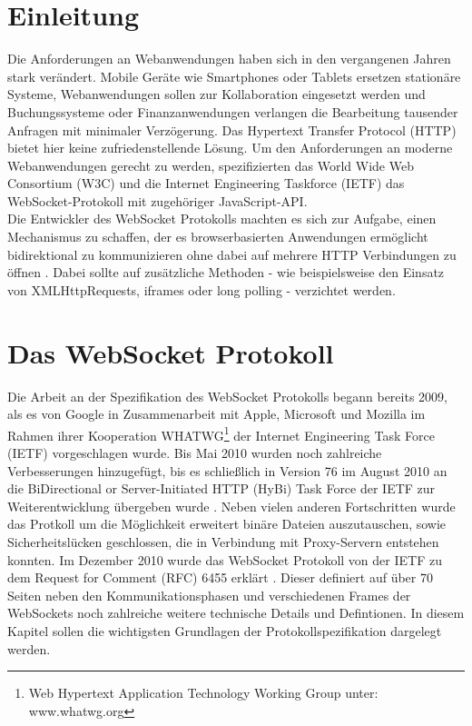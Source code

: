 \documentclass[11pt,a4paper,titlepage]{scrartcl}
\numberwithin{equation}{section}
\begin{document}
\section{Einleitung}\label{sec:Einleitung}
Die Anforderungen an Webanwendungen haben sich in den vergangenen Jahren stark verändert. Mobile Geräte wie Smartphones oder Tablets ersetzen stationäre Systeme, Webanwendungen sollen zur Kollaboration eingesetzt werden und Buchungssysteme oder Finanzanwendungen verlangen die Bearbeitung tausender Anfragen mit minimaler Verzögerung. Das Hypertext Transfer Protocol (HTTP) bietet hier keine zufriedenstellende Lösung. Um den Anforderungen an moderne Webanwendungen gerecht zu werden, spezifizierten das World Wide Web Consortium (W3C) und die Internet Engineering Taskforce (IETF) das WebSocket-Protokoll mit zugehöriger JavaScript-API. \\

\noindent Die Entwickler des WebSocket Protokolls machten es sich zur Aufgabe, einen Mechanismus zu schaffen, der es browserbasierten Anwendungen ermöglicht bidirektional zu kommunizieren ohne dabei auf mehrere HTTP Verbindungen zu öffnen \autocite{fette_websocket_2011}. Dabei sollte auf zusätzliche Methoden - wie beispielsweise den Einsatz von XMLHttpRequests, iframes oder long polling - verzichtet werden.

\newpage
\section{Das WebSocket Protokoll}\label{sec:WebSocketProtokoll}
Die Arbeit an der Spezifikation des WebSocket Protokolls begann bereits 2009, als es von Google in Zusammenarbeit mit Apple, Microsoft und Mozilla im Rahmen ihrer Kooperation WHATWG\footnote{Web Hypertext Application Technology Working Group unter: www.whatwg.org} der Internet Engineering Task Force (IETF) vorgeschlagen wurde. Bis Mai 2010 wurden noch zahlreiche Verbesserungen hinzugefügt, bis es schließlich in Version 76 \autocite{hickson_websocket_2010} im August 2010 an die BiDirectional or Server-Initiated HTTP (HyBi) Task Force der IETF zur Weiterentwicklung übergeben wurde \autocite{fette_websocket_2010}. Neben vielen anderen Fortschritten wurde das Protkoll um die Möglichkeit erweitert binäre Dateien auszutauschen, sowie Sicherheitslücken geschlossen, die in Verbindung mit Proxy-Servern entstehen konnten. Im Dezember 2010 wurde das WebSocket Protokoll von der IETF zu dem Request for Comment (RFC) 6455 erklärt \autocite{fette_websocket_2011}. Dieser definiert auf über 70 Seiten neben den Kommunikationsphasen und verschiedenen Frames der WebSockets noch zahlreiche weitere technische Details und Defintionen. In diesem Kapitel sollen die wichtigsten Grundlagen der Protokollspezifikation dargelegt werden.
\end{document}
